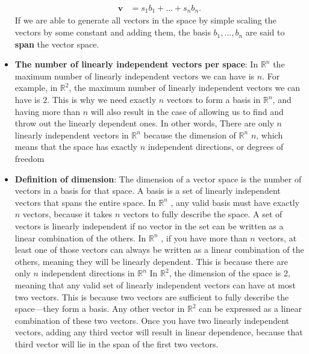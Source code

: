 \documentclass{report}
\begin{document}
\begin{itemize}
            \begin{align*}
                \mathbf{v} &= s_{1}b_{1} + ...  + s_{n}b_{n}
            .\end{align*}
            \bigbreak \noindent 
            If we are able to generate all vectors in the space by simple scaling the vectors by some constant and adding them, the basis $b_{1}, ...,b_{n} $ are said to \textbf{span} the vector space.
        \item \textbf{The number of linearly independent vectors per space}: In $\mathbb{R}^{n}$ the maximum number of linearly independent vectors we can have is $n$. For example, in $\mathbb{R}^{2}$, the maximum number of linearly independent vectors we can have is $2$. This is why we need exactly $n$ vectors to form a basis in $\mathbb{R}^{n}$, and having more than $n$ will also result in the case of allowing us to find and throw out the linearly dependent ones.
            \bigbreak \noindent 
            In other words, There are only $n$ linearly independent vectors in $\mathbb{R}^{n}$ because the dimension of $\mathbb{R}^{n}$ $n$, which means that the space has exactly $n$ independent directions, or degrees of freedom
        \item \textbf{Definition of dimension}: The dimension of a vector space is the number of vectors in a basis for that space. A basis is a set of linearly independent vectors that spans the entire space. In $\mathbb{R}^{n} $ , any valid basis must have exactly $n$ vectors, because it takes $n$ vectors to fully describe the space.
            \bigbreak \noindent 
            A set of vectors is linearly independent if no vector in the set can be written as a linear combination of the others. In $\mathbb{R}^{n}$ , if you have more than $n$ vectors, at least one of those vectors can always be written as a linear combination of the others, meaning they will be linearly dependent. This is because there are only $n$ independent directions in $\mathbb{R}^{n}$
            \bigbreak \noindent 
            In $\mathbb{R}^{2}$, the dimension of the space is 2, meaning that any valid set of linearly independent vectors can have at most two vectors. This is because two vectors are sufficient to fully describe the space—they form a basis. Any other vector in $\mathbb{R}^{2}$ can be expressed as a linear combination of these two vectors.
            \bigbreak \noindent 
            Once you have two linearly independent vectors, adding any third vector will result in linear dependence, because that third vector will lie in the span of the first two vectors.

\end{itemize}
\end{document}
